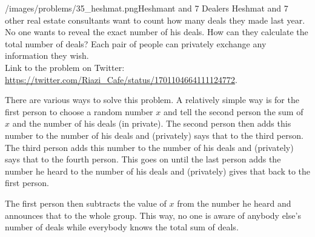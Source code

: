 \begin{problem}{/images/problems/35_heshmat.png}{Heshmant and 7 Dealers}
Heshmat and 7 other real estate consultants want to count how many deals they made last year. No one wants to reveal the exact number of his deals. How can they calculate the total number of deals? Each pair of people can privately exchange any information they wish.\\[0.2cm]

Link to the problem on Twitter: \url{https://twitter.com/Riazi_Cafe/status/1701104664111124772}.

\end{problem}
\begin{solution}
There are various ways to solve this problem.
A relatively simple way is for the first person to choose a random number $x$ and tell the second person the sum of $x$ and the number of his deals (in private). The second person then adds this number to the number of his deals and (privately) says that to the third person. The third person adds this number to the number of his deals and (privately) says that to the fourth person. This goes on until the last person adds the number he heard to the number of his deals and (privately) gives that back to the first person.

The first person then subtracts the value of $x$ from the number he heard and announces that to the whole group. This way, no one is aware of anybody else's number of deals while everybody knows the total sum of deals.

\end{solution}
